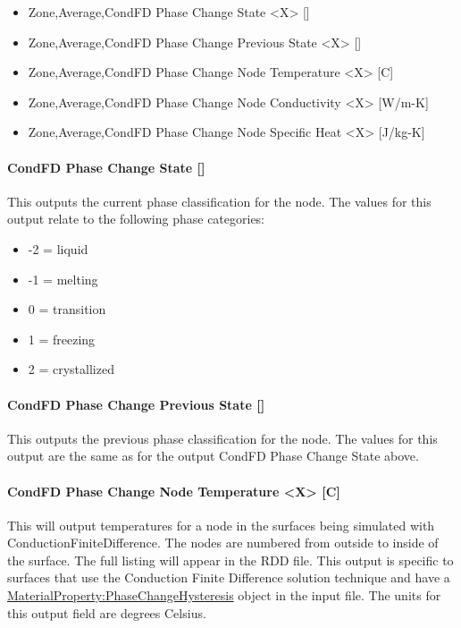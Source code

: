 \begin{itemize}
\item
  Zone,Average,CondFD Phase Change State \textless{}X\textgreater{} {[]}
\item
  Zone,Average,CondFD Phase Change Previous State \textless{}X\textgreater{} {[]}
\item
  Zone,Average,CondFD Phase Change Node Temperature \textless{}X\textgreater{} {[}C{]}
\item
  Zone,Average,CondFD Phase Change Node Conductivity \textless{}X\textgreater{} {[}W/m-K{]}
\item
  Zone,Average,CondFD Phase Change Node Specific Heat \textless{}X\textgreater{} {[}J/kg-K{]}
\end{itemize}

\paragraph{CondFD Phase Change State {[]}}\label{condfd-phase-change-state}

This outputs the current phase classification for the node.  The values for this output relate to the following phase categories:

\begin{itemize}
\item
-2 = liquid
\item
-1 = melting
\item
0 = transition
\item
1 = freezing
\item
2 = crystallized
\end{itemize}

\paragraph{CondFD Phase Change Previous State {[]}}\label{condfd-phase-change-previous-state}

This outputs the previous phase classification for the node.  The values for this output are the same as for the output CondFD Phase Change State above.

\paragraph{CondFD Phase Change Node Temperature \textless{}X\textgreater{} {[}C{]}}\label{condfd-phase-change-node-temperature-x-c}

This will output temperatures for a node in the surfaces being simulated with ConductionFiniteDifference. The nodes are numbered from outside to inside of the surface.  The full listing will appear in the RDD file.  This output is specific to surfaces that use the Conduction Finite Difference solution technique and have a \hyperref[materialpropertyphasechangehysteresis]{MaterialProperty:PhaseChangeHysteresis} object in the input file.  The units for this output field are degrees Celsius.

